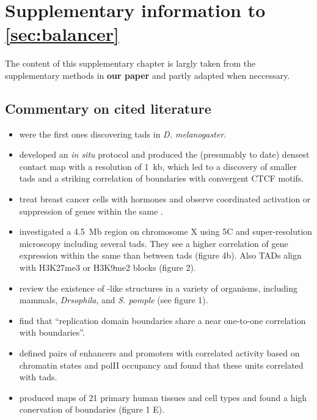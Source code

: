 \chapter{Supplementary information to \texorpdfstring{\cref{sec:balancer}}{the balancer project}}
\label{sec:suppl_balancer}


The content of this supplementary chapter is largly taken from the supplementary
methods in \textbf{our paper} and partly adapted when
neccessary.


\section{Commentary on cited literature}
\label{sec:suppl_balancer_literature}

\begin{itemize}
\item \cite{Sexton2012} were the first ones discovering \acp{tad} in \textit{D.
    melanogaster}.
\item \cite{Rao2014a} developed an \textit{in situ} \hic protocol and produced
    the (presumably to date) densest \hic contact map
    with a resolution of 1~kb, which led to a discovery of smaller \acp{tad} and
    a striking correlation of \tad boundaries with convergent CTCF motifs.
\item \cite{LeDily2014} treat breast cancer cells with hormones and observe
    coordinated activation or suppression of genes within the same \tad.
\item \cite{Nora2012} investigated a 4.5~Mb region on chromosome X using 5C and
    super-resolution microscopy including several \acp{tad}. They see a higher
    correlation of gene expression within the same \tad than between \acp{tad}
    (figure 4b). Also TADs align with H3K27me3 or H3K9me2 blocks (figure 2).
\item \cite{Dekker2015} review the existence of \tad-like structures in a
    variety of organisms, including mammals, \textit{Drsophila}, and
    \textit{S. pomple} (see figure 1).
\item \cite{Pope2014} find that ``replication domain boundaries share a near
    one-to-one correlation with \tad boundaries''.
\item \cite{Shen2012} defined pairs of enhancers and promoters with correlated
    activity based on chromatin states and polII occupancy and found that these
    units correlated with \acp{tad}.
\item \cite{Schmitt2016} produced \hic maps of 21 primary human tissues and cell
    types and found a high conervation of \tad boundaries (figure 1 E).
\end{itemize}





